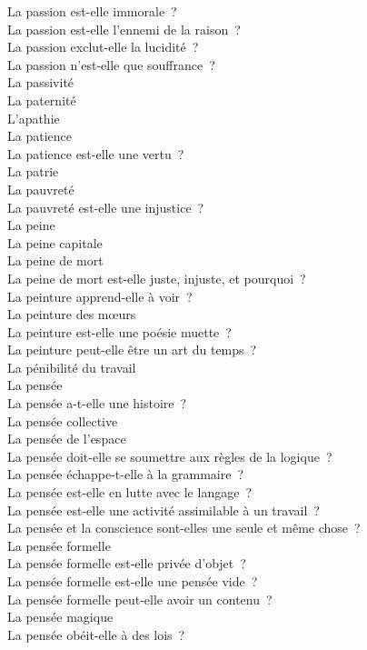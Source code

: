 \documentclass[a4paper,12pt]{article}
\begin{document}
La passion est-elle immorale ? \\
La passion est-elle l'ennemi de la raison ? \\
La passion exclut-elle la lucidité ? \\
La passion n'est-elle que souffrance ? \\
La passivité \\
La paternité \\
L'apathie \\
La patience \\
La patience est-elle une vertu ? \\
La patrie \\
La pauvreté \\
La pauvreté est-elle une injustice ? \\
La peine \\
La peine capitale \\
La peine de mort \\
La peine de mort est-elle juste, injuste, et pourquoi ? \\
La peinture apprend-elle à voir ? \\
La peinture des mœurs \\
La peinture est-elle une poésie muette ? \\
La peinture peut-elle être un art du temps ? \\
La pénibilité du travail \\
La pensée \\
La pensée a-t-elle une histoire ? \\
La pensée collective \\
La pensée de l'espace \\
La pensée doit-elle se soumettre aux règles de la logique ? \\
La pensée échappe-t-elle à la grammaire ? \\
La pensée est-elle en lutte avec le langage ? \\
La pensée est-elle une activité assimilable à un travail ? \\
La pensée et la conscience sont-elles une seule et même chose ? \\
La pensée formelle \\
La pensée formelle est-elle privée d'objet ? \\
La pensée formelle est-elle une pensée vide ? \\
La pensée formelle peut-elle avoir un contenu ? \\
La pensée magique \\
La pensée obéit-elle à des lois ? \\
\end{document}
